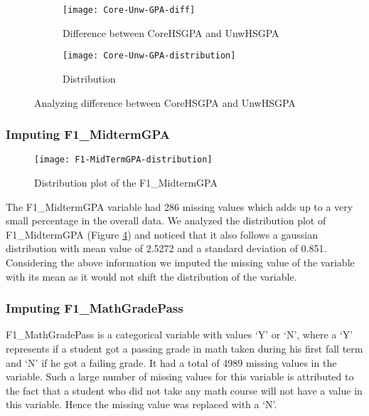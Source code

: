 \documentclass[11pt,openright]{report}
\begin{document}
\begin{figure}[!htbp]
\centering
    \begin{subfigure}[b]{0.55\textwidth}            
            \texttt{[image: Core-Unw-GPA-diff]}
            \caption{Difference between CoreHSGPA and UnwHSGPA}
            \label{fig:Core_Unw_diff}
    \end{subfigure}%
    \begin{subfigure}[b]{0.55\textwidth}
            \centering
            \texttt{[image: Core-Unw-GPA-distribution]}
            \caption{Distribution }
            \label{fig:Core_Unw_dist}
    \end{subfigure}
    \caption{Analyzing difference between CoreHSGPA and UnwHSGPA }\label{fig:diffHSGPA}
\end{figure}

\subsubsection {Imputing F1\_MidtermGPA}

\begin{figure}[!ht]
	\centering
	\texttt{[image: F1-MidTermGPA-distribution]}
	\caption{Distribution plot of the F1\_MidtermGPA}
	\label{fig:F1_MidtermGPA_plot}
\end{figure}

The F1\_MidtermGPA variable had 286 missing values which adds up to a very small percentage in the overall data. We analyzed the distribution plot of F1\_MidtermGPA (Figure \ref{fig:F1_MidtermGPA_plot}) and noticed that it also follows a gaussian distribution with mean value of 2.5272 and a standard deviation of 0.851. Considering the above information we imputed the missing value of the variable with its mean as it would not shift the distribution of the variable.

\subsubsection {Imputing F1\_MathGradePass}
F1\_MathGradePass is a categorical variable with values `Y' or `N', where a `Y' represents if a student got a passing grade in math taken during his first fall term and `N' if he got a failing grade. It had a total of 4989 missing values in the variable. Such a large number of missing values for this variable is attributed to the fact that a student who did not take any math course will not have a value in this variable. Hence the missing value was replaced with a `N'.
\end{document}
